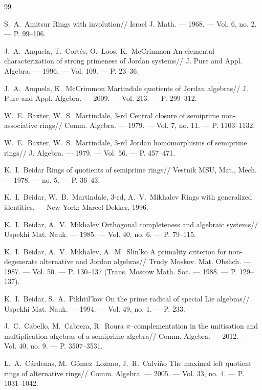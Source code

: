 \documentclass[a4paper,11pt]{article}
\begin{document}
\begin{thebibliography}{99} 

 S.~A.~Amitsur Rings with involution// Israel J. Math. --- 1968. 
--- Vol. 6, no. 2. --- P. 99--106. 

 J.~A.~Anquela, T.~Cort\'es, O.~Loos, K.~McCrimmon An elemental 
characterization of strong primeness of Jordan systems// J. Pure and Appl. Algebra. --- 
1996. --- Vol. 109. --- P. 23--36.

 J.~A.~Anquela, K.~McCrimmon Martindale quotients of Jordan 
algebras// J. Pure and Appl. Algebra. --- 2009. --- Vol. 213. --- P. 299--312.
                                                       
 W.~E.~Baxter, W.~S.~Martindale, 3-rd Central closure of 
semiprime non-associative rings// Comm. Algebra. --- 1979. --- Vol. 7, no. 11. --- 
P. 1103--1132.

 W.~E.~Baxter, W.~S.~Martindale, 3-rd Jordan homomorphisms of 
semiprime rings// J. Algebra. --- 1979. --- Vol. 56. --- P. 457--471.

 K.~I.~Beidar Rings of quotients of semiprime rings// Vestnik MSU, 
Mat., Mech. --- 1978. --- no. 5. --- P. 36--43. 

 K.~I.~Beidar, W.~B.~Martindale, 3-rd, A.~V.~Mikhalev Rings with 
generalized identities. --- New York: Marcel Dekker, 1996.

 K.~I.~Beidar, A.~V.~Mikhalev Orthogonal completeness and 
algebraic systems// Uspekhi Mat. Nauk. --- 1985. --- Vol. 40, no. 6. --- 
P. 79--115.

 K.~I.~Beidar, A.~V.~Mikhalev, A.~M.~Slin'ko A primality criterion 
for non-degenerate alternative and Jordan algebras// Trudy Moskov. 
Mat. Obshch. --- 1987. --- Vol. 50. --- P. 130--137 (Trans. Moscow Math. 
Soc. --- 1988. --- P. 129--137).

 K.~I.~Beidar, S.~A.~Pikhtil'kov On the prime radical of 
special Lie algebras// Uspekhi Mat. Nauk. --- 1994. --- Vol. 49, no. 1. --- P. 233.

 J.~C.~Cabello, M.~Cabrera, R.~Roura $\pi$--complementation 
in the unitisation and multiplication algebras of a semiprime algebra// Comm. 
Algebra. --- 2012. --- Vol. 40, no. 9. --- P. 3507--3531.

 L.~A.~C{\'a}rdenas, M.~G{\'o}mez~Lozano, J.~R.~Calvi{\~n}o The maximal 
left quotient rings of alternative rings// Comm. Algebra. --- 2005. --- Vol. 33, 
no. 4. --- P. 1031--1042.


\end{thebibliography}
\end{document}
